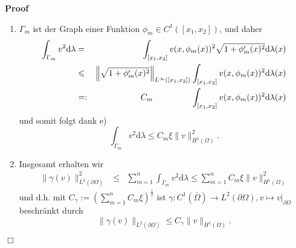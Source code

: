 \documentclass{book}
\newcommand{\assign}{:=}
\newcommand{\backassign}{=:}
\newcommand{\mathd}{\mathrm{d}}
\newcommand{\nobracket}{}
\newenvironment{enumeratealpha}{\begin{enumerate}[a{\textup{)}}] }{\end{enumerate}}
\newenvironment{proof}{\noindent\textbf{Proof\ }}{\hspace*{\fill}$\Box$\medskip}
\begin{document}
\begin{proof}
\begin{enumeratealpha}
\[       (s) \]
    und mit Division durch $\delta^2$ und dann Integration bzgl. $x$ erhalten
    wir
    \begin{eqnarray*}
      &  & \int_{[x_1, x_2]} v (x, \phi_m (x))^2 \mathd \lambda (x)\\
      & \leqslant & \frac{2}{\delta} \int_{\Omega^{\delta}_m} v (x, y)^2
      \mathd \lambda (x) \mathd \lambda (y) + \frac{2}{3} \delta
      \int_{\Omega^{\delta}_m} (\partial_y v (x, y))^2 \mathd \lambda (x)
      \mathd \lambda (y)\\
      & \leqslant & \max \left\{ \frac{2}{\delta}, \frac{2}{3} \delta
      \right\} \int_{\Omega^{\delta}_m} v^2 + \partial_y v^2 \mathd
      \lambda^2\\
      & \leqslant & \max \left\{ \frac{2}{\delta}, \frac{2}{3} \delta
      \right\} \int_{\Omega^{\delta}_m} v^2 + \partial_y v^2 + \partial_x v^2
      \mathd \lambda^2\\
      & = & \max \left\{ \frac{2}{\delta}, \frac{2}{3} \delta \right\} \| v
      \|^2_{H^1 (\Omega)}\\
      & \backassign & \text{{\hspace{3em}}} \xi \text{{\hspace{2.7em}}} \| v
      \|^2_{H^1 (\Omega)} .
    \end{eqnarray*}
    \item  $\Gamma_m$ ist der Graph einer Funktion $\phi_m \in C^1 ([x_1,
    x_2])$, und daher
    \begin{eqnarray*}
      \int_{\Gamma_m} v^2 \mathd \lambda & = & \int_{[x_1, x_2]} v (x, \phi_m
      (x))^2 \sqrt{1 + \phi_m' (x)^2} \mathd \lambda (x)\\
      & \leqslant & \left\| \sqrt{1 + \phi_m' (x)^2} \right\|_{L^{\infty}
      ([x_1, x_2])} \int_{[x_1, x_2]} v (x, \phi_m (x))^2 \mathd \lambda (x)\\
      & \backassign & \text{{\hspace{5em}}} C_m \hspace{4.5em} \int_{[x_1,
      x_2]} v (x, \phi_m (x))^2 \mathd \lambda (x)
    \end{eqnarray*}
    und somit folgt dank e)
    \[ \int_{\Gamma_m} v^2 \mathd \lambda \leq C_m \xi \| v \|^2_{H^1
       (\Omega)} . \]
    \item Insgesamt erhalten wir
    \begin{eqnarray*}
      \| \gamma (v) \|^2_{L^2 (\partial \Omega)} & \leqslant & \sum_{m = 1}^n
      \int_{\Gamma_m} v^2 \mathd \lambda \leq \sum_{m = 1}^n C_m \xi \| v
      \|^2_{H^1 (\Omega)}
    \end{eqnarray*}
    und d.h. mit $C_{\gamma} \assign \left( \sum_{m = 1}^n C_m \xi
    \right)^{\frac{1}{2}}$ ist $\gamma : C^1 (\bar{\Omega}) \rightarrow L^2
    (\partial \Omega), \text{} v \mapsto v |_{\partial \Omega} \nobracket$
    beschr{\"a}nkt durch \
    \[ \| \gamma (v) \|_{L^2 (\partial \Omega)} \leqslant C_{\gamma} \| v \|
       _{H^1 (\Omega)} . \]
  \end{enumeratealpha}
\end{proof}
\end{document}
